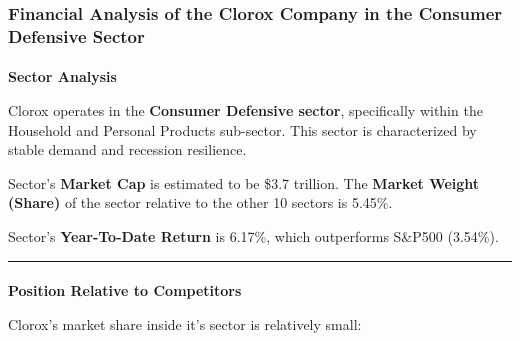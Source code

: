 \documentclass[
  letterpaper,
  DIV=11,
  numbers=noendperiod]{scrartcl}
\makeatletter
\let\oldparagraph\paragraph
\renewcommand{\paragraph}{
    \@ifstar
      \xxxParagraphStar
      \xxxParagraphNoStar
  }
\newcommand{\xxxParagraphStar}[1]{\oldparagraph*{#1}\mbox{}}
\newcommand{\xxxParagraphNoStar}[1]{\oldparagraph{#1}\mbox{}}
\makeatother
\begin{document}
\subsubsection{\texorpdfstring{\textbf{Financial Analysis of the Clorox
Company in the Consumer Defensive
Sector}}{Financial Analysis of the Clorox Company in the Consumer Defensive Sector}}\label{financial-analysis-of-the-clorox-company-in-the-consumer-defensive-sector}

\paragraph{\texorpdfstring{\textbf{Sector
Analysis}}{Sector Analysis}}\label{sector-analysis-1}

Clorox operates in the \textbf{Consumer Defensive sector}, specifically
within the Household and Personal Products sub-sector. This sector is
characterized by stable demand and recession resilience.

Sector's \textbf{Market Cap} is estimated to be \$3.7 trillion. The
\textbf{Market Weight (Share)} of the sector relative to the other 10
sectors is 5.45\%.

Sector's \textbf{Year-To-Date Return} is 6.17\%, which outperforms
S\&P500 (3.54\%).

\begin{center}\rule{0.5\linewidth}{0.5pt}\end{center}

\paragraph{\texorpdfstring{\textbf{Position Relative to
Competitors}}{Position Relative to Competitors}}\label{position-relative-to-competitors}

Clorox's market share inside it's sector is relatively small:
\end{document}
